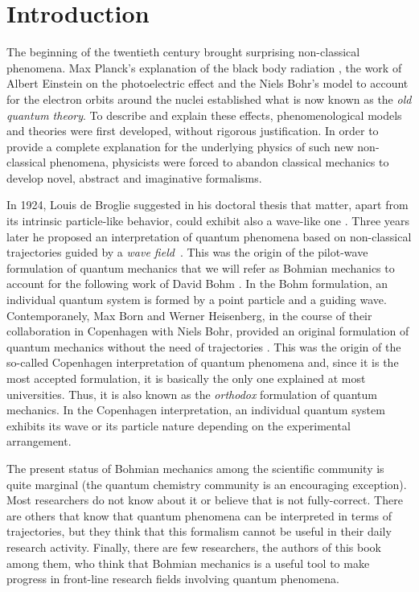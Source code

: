 \documentclass[nofootinbib, secnumarabic, amsmath, nobibnotes,10pt,aps,pra]{revtex4-1}
\begin{document}
\section{Introduction \label{introduction}}


The beginning of the twentieth century brought surprising non-classical phenomena. Max Planck's explanation of the black body radiation \cite{om.Planck-BlackBody}, the work of Albert Einstein on the photoelectric effect \cite{om.Einstein-Photoelectric} and the Niels Bohr's model to account for the electron orbits around the nuclei \cite{om.bohr,om.bohr2,om.bohr3} established what is now known as the \textit{old quantum theory}.
To describe and explain these effects, phenomenological models and theories were first developed, without rigorous justification. In order to provide a complete explanation for the underlying physics of such new non-classical phenomena, physicists were forced to abandon classical mechanics to develop novel, abstract and imaginative formalisms.

In 1924, Louis de Broglie suggested in his doctoral thesis that matter, apart from its intrinsic particle-like behavior, could exhibit also a wave-like one \cite{om.dB_AnnPhys}. Three years later he proposed an interpretation of quantum phenomena based on non-classical trajectories guided by a \emph{wave field}~\cite{om.debroglie1927b}.
This was the origin of the pilot-wave formulation of quantum mechanics that we will refer as Bohmian mechanics to account for the following work of David Bohm \cite{om.bohm1952a,om.bohm1952b}. In the Bohm formulation, an individual quantum system is formed by a point particle and a guiding wave.
Contemporanely, Max Born and Werner Heisenberg, in the course of their collaboration in Copenhagen with Niels Bohr, provided an original formulation of quantum mechanics without the need of trajectories \cite{om.Born1926,om.Heisenber1925}. This was the origin of the so-called Copenhagen interpretation of quantum phenomena and, since it is the most accepted formulation, it is basically the only one explained at most universities. Thus, it is also known as the \emph{orthodox} formulation of quantum mechanics. In the Copenhagen interpretation, an individual quantum system exhibits its wave or its particle nature depending on the experimental arrangement.

The present status of Bohmian mechanics among the scientific community is quite marginal (the quantum chemistry community is an encouraging exception). Most researchers do not know about it or believe that is not fully-correct. There are others that know that quantum phenomena can be interpreted in terms of trajectories, but they think that this formalism cannot be useful in their daily research activity. Finally, there are few researchers, the authors of this book among them, who think that Bohmian mechanics is a useful tool to make progress in front-line research fields involving quantum phenomena.
\end{document}
